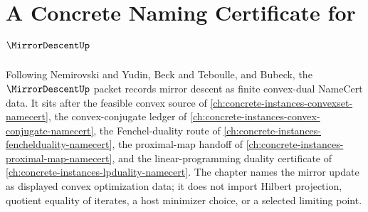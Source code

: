 \chapter{A Concrete Naming Certificate for $\MirrorDescentUp$}
\label{ch:concrete-instances-mirror-descent-namecert}

Following Nemirovski and Yudin, Beck and Teboulle, and Bubeck, the $\MirrorDescentUp$ packet records mirror descent as finite convex-dual NameCert data. It sits after the feasible convex source of \autoref{ch:concrete-instances-convexset-namecert}, the convex-conjugate ledger of \autoref{ch:concrete-instances-convex-conjugate-namecert}, the Fenchel-duality route of \autoref{ch:concrete-instances-fenchelduality-namecert}, the proximal-map handoff of \autoref{ch:concrete-instances-proximal-map-namecert}, and the linear-programming duality certificate of \autoref{ch:concrete-instances-lpduality-namecert}. The chapter names the mirror update as displayed convex optimization data; it does not import Hilbert projection, quotient equality of iterates, a host minimizer choice, or a selected limiting point.

